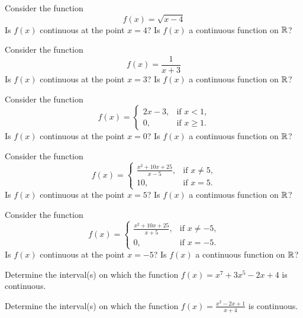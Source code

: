 \begin{exercises}

\begin{exercise} 
Consider the function
\[
f(x) = \sqrt{x-4} 
\]
Is $f(x)$ continuous at the point $x=4$?  Is $f(x)$ a continuous
function on $\mathbb{R}$?
\end{exercise}


\begin{exercise} 
Consider the function
\[
f(x) = \frac{1}{x+3}
\]
Is $f(x)$ continuous at the point $x=3$?  Is $f(x)$ a continuous
function on $\mathbb{R}$?
\end{exercise}

\begin{exercise} 
Consider the function
\[
f(x) = 
\begin{cases} 
2x - 3, & \text{if $x<1$,} \\ 
0,      & \text{if $x\geq 1$.}
\end{cases}
\]
Is $f(x)$ continuous at the point $x=0$?  Is $f(x)$ a continuous
function on $\mathbb{R}$?
\end{exercise}



\begin{exercise} 
Consider the function
\[
f(x) = 
\begin{cases} 
\frac{x^2 + 10x + 25}{x-5}, & \text{if $x\ne 5$,} \\ 
10,      & \text{if $x= 5$.}
\end{cases}
\]
Is $f(x)$ continuous at the point $x=5$?  Is $f(x)$ a continuous
function on $\mathbb{R}$?
\end{exercise}


\begin{exercise} 
Consider the function
\[
f(x) = 
\begin{cases} 
\frac{x^2 + 10x + 25}{x+5}, & \text{if $x\ne -5$,} \\ 
0,      & \text{if $x= -5$.}
\end{cases}
\]
Is $f(x)$ continuous at the point $x=-5$?  Is $f(x)$ a continuous
function on $\mathbb{R}$?
\end{exercise}



\begin{exercise} 
Determine the interval(s) on which the function $f(x) = x^7+3x^5-2x +
4$ is continuous.
\end{exercise}



\begin{exercise}
Determine the interval(s) on which the function $f(x) = \frac{x^2-2x+1}{x+4}$ is continuous. 
\end{exercise}




\end{exercises}
